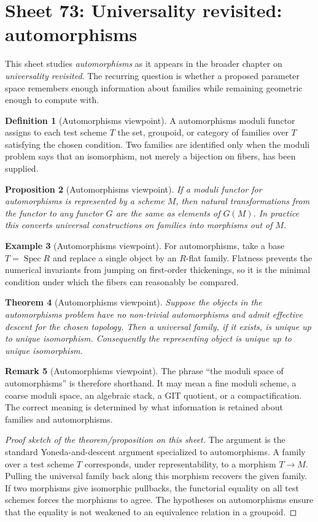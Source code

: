 \documentclass[11pt]{amsart}
\newtheorem{theorem}{Theorem}[section]
\newtheorem{proposition}[theorem]{Proposition}
\theoremstyle{definition}
\newtheorem{definition}[theorem]{Definition}
\newtheorem{example}[theorem]{Example}
\newtheorem{remark}[theorem]{Remark}
\newcommand{\Spec}{\operatorname{Spec}}
\begin{document}
\section{Sheet 73: Universality revisited: automorphisms}
This sheet studies \emph{automorphisms} as it appears in the broader chapter on \emph{universality revisited}.  The recurring question is whether a proposed parameter space remembers enough information about families while remaining geometric enough to compute with.
\begin{definition}[Automorphisms viewpoint]
A automorphisms moduli functor assigns to each test scheme $T$ the set, groupoid, or category of families over $T$ satisfying the chosen condition.  Two families are identified only when the moduli problem says that an isomorphism, not merely a bijection on fibers, has been supplied.
\end{definition}
\begin{proposition}[Automorphisms viewpoint]
If a moduli functor for automorphisms is represented by a scheme $M$, then natural transformations from the functor to any functor $G$ are the same as elements of $G(M)$.  In practice this converts universal constructions on families into morphisms out of $M$.
\end{proposition}
\begin{example}[Automorphisms viewpoint]
For automorphisms, take a base $T=\Spec R$ and replace a single object by an $R$-flat family.  Flatness prevents the numerical invariants from jumping on first-order thickenings, so it is the minimal condition under which the fibers can reasonably be compared.
\end{example}
\begin{theorem}[Automorphisms viewpoint]
Suppose the objects in the automorphisms problem have no non-trivial automorphisms and admit effective descent for the chosen topology.  Then a universal family, if it exists, is unique up to unique isomorphism.  Consequently the representing object is unique up to unique isomorphism.
\end{theorem}
\begin{remark}[Automorphisms viewpoint]
The phrase ``the moduli space of automorphisms'' is therefore shorthand.  It may mean a fine moduli scheme, a coarse moduli space, an algebraic stack, a GIT quotient, or a compactification.  The correct meaning is determined by what information is retained about families and automorphisms.
\end{remark}
\begin{proof}[Proof sketch of the theorem/proposition on this sheet]
The argument is the standard Yoneda-and-descent argument specialized to automorphisms.  A family over a test scheme $T$ corresponds, under representability, to a morphism $T\to M$.  Pulling the universal family back along this morphism recovers the given family.  If two morphisms give isomorphic pullbacks, the functorial equality on all test schemes forces the morphisms to agree.  The hypotheses on automorphisms ensure that the equality is not weakened to an equivalence relation in a groupoid.
\end{proof}
\end{document}
